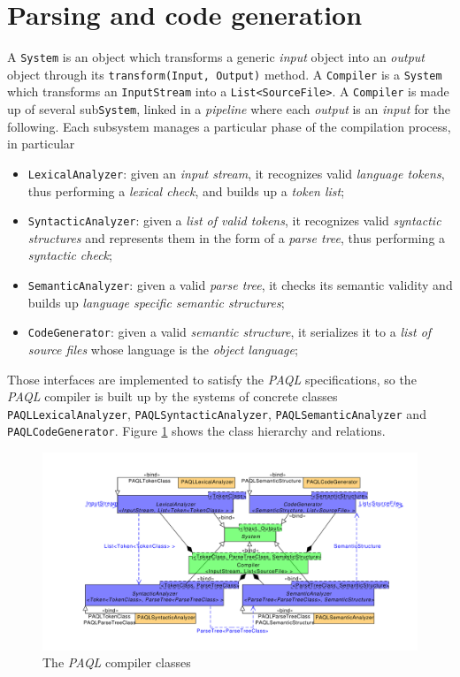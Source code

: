 \documentclass[10pt]{article}  %
\begin{document}
\section{Parsing and code generation}
    A \texttt{System} is an object which transforms a generic \emph{input} object into an \emph{output} object
    through its \texttt{transform(Input, Output)} method. A \texttt{Compiler} is a \texttt{System} which transforms an \texttt{InputStream}
    into a \texttt{List<SourceFile>}. A \texttt{Compiler} is made up of several sub\texttt{System}, linked in a \emph{pipeline} where
    each \emph{output} is an \emph{input} for the following. Each subsystem manages a particular phase of the compilation process,
    in particular
    \begin{itemize}
        \item \texttt{LexicalAnalyzer}: given an \emph{input stream}, it recognizes valid \emph{language tokens}, thus performing a
        \emph{lexical check}, and builds up a \emph{token list};
        \item \texttt{SyntacticAnalyzer}: given a \emph{list of valid tokens}, it recognizes valid \emph{syntactic structures}
        and represents them in the form of a \emph{parse tree}, thus performing a \emph{syntactic check};
        \item \texttt{SemanticAnalyzer}: given a valid \emph{parse tree}, it checks its semantic validity and builds up
        \emph{language specific semantic structures};
        \item \texttt{CodeGenerator}: given a valid \emph{semantic structure}, it serializes it to a \emph{list of source files}
        whose language is the \emph{object language};
    \end{itemize}
    Those interfaces are implemented to satisfy the \emph{PAQL} specifications, so the \emph{PAQL} compiler is built up by
    the systems of concrete classes \texttt{PAQLLexicalAnalyzer}, \texttt{PAQLSyntacticAnalyzer}, \texttt{PAQLSemanticAnalyzer} and
    \texttt{PAQLCodeGenerator}. Figure \ref{fig:compiler} shows the class hierarchy and relations.
    \begin{figure}[htbp]
    \hspace{-4em}
        \includegraphics[scale=0.45]{Compiler.pdf}
        \caption{The \emph{PAQL} compiler classes}\label{fig:compiler}
    \end{figure}
\end{document}
